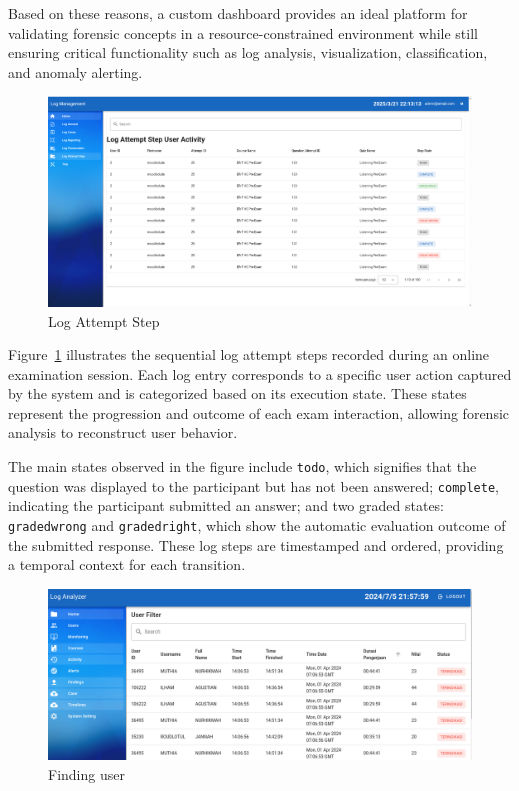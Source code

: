 Based on these reasons, a custom dashboard provides an ideal platform for validating forensic concepts in a resource-constrained environment while still ensuring critical functionality such as log analysis, visualization, classification, and anomaly alerting.

\begin{figure}[H] 
	\centering
	\includegraphics[width=16cm]{figure/log_attempt_step.png}
	\caption{Log Attempt Step}
	\label{fig:log-attempt-step}
\end{figure}
Figure~\ref{fig:log-attempt-step} illustrates the sequential log attempt steps recorded during an online examination session. Each log entry corresponds to a specific user action captured by the system and is categorized based on its execution state. These states represent the progression and outcome of each exam interaction, allowing forensic analysis to reconstruct user behavior.

The main states observed in the figure include \texttt{todo}, which signifies that the question was displayed to the participant but has not been answered; \texttt{complete}, indicating the participant submitted an answer; and two graded states: \texttt{gradedwrong} and \texttt{gradedright}, which show the automatic evaluation outcome of the submitted response. These log steps are timestamped and ordered, providing a temporal context for each transition.
\begin{figure}[H] 
	\centering
	\includegraphics[width=14cm]{figure/findings_20240809_215805.png}
	\caption{Finding user}
	\label{fig:findings-user}
\end{figure}


